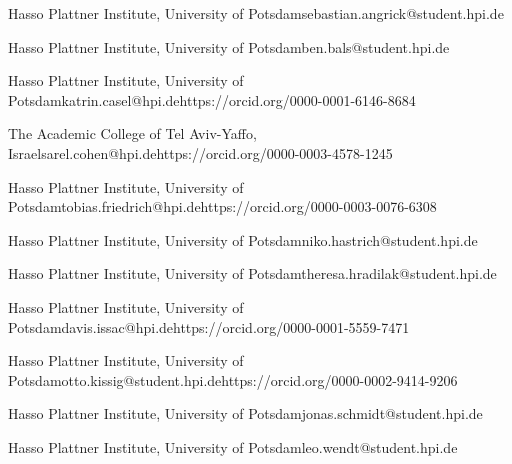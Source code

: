 \usepackage{amsmath}
\usepackage{amssymb}
\usepackage{mathtools}
\usepackage{todonotes}


\graphicspath{{./img/}}%


\author{Sebastian Angrick}{Hasso Plattner Institute, University of Potsdam}{sebastian.angrick@student.hpi.de}{}{}
\author{Ben Bals}{Hasso Plattner Institute, University of Potsdam}{ben.bals@student.hpi.de}{}{}
\author{Katrin Casel}{Hasso Plattner Institute, University of Potsdam}{katrin.casel@hpi.de}{https://orcid.org/0000-0001-6146-8684}{}
\author{Sarel Cohen}{The Academic College of Tel Aviv-Yaffo, Israel}{sarel.cohen@hpi.de}{https://orcid.org/0000-0003-4578-1245}{}
\author{Tobias Friedrich}{Hasso Plattner Institute, University of Potsdam}{tobias.friedrich@hpi.de}{https://orcid.org/0000-0003-0076-6308}{}
\author{Niko Hastrich}{Hasso Plattner Institute, University of Potsdam}{niko.hastrich@student.hpi.de}{}{}
\author{Theresa Hradilak}{Hasso Plattner Institute, University of Potsdam}{theresa.hradilak@student.hpi.de}{}{}
\author{Davis Issac}{Hasso Plattner Institute, University of Potsdam}{davis.issac@hpi.de}{https://orcid.org/0000-0001-5559-7471}{}
\author{Otto Kißig}{Hasso Plattner Institute, University of Potsdam}{otto.kissig@student.hpi.de}{https://orcid.org/0000-0002-9414-9206}{}
\author{Jonas Schmidt}{Hasso Plattner Institute, University of Potsdam}{jonas.schmidt@student.hpi.de}{}{}
\author{Leo Wendt}{Hasso Plattner Institute, University of Potsdam}{leo.wendt@student.hpi.de}{}{}





